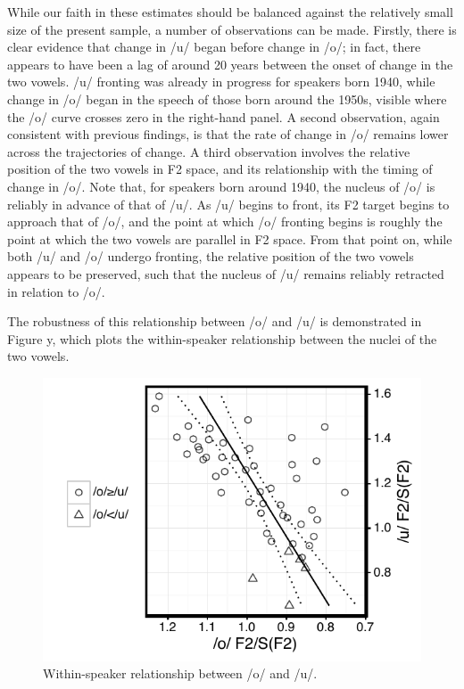 \documentclass[12pt]{article}
\begin{document}
\vspace*{6pt}
While our faith in these estimates should be balanced against the relatively small size of the present sample, a number of observations can be made. Firstly, there is clear evidence that change in /u/ began before change in /o/; in fact, there appears to have been a lag of around 20 years between the onset of change in the two vowels. /u/ fronting was already in progress for speakers born 1940, while change in /o/ began in the speech of those born around the 1950s, visible where the /o/ curve crosses zero in the right-hand panel. A second observation, again consistent with previous findings, is that the rate of change in /o/ remains lower across the trajectories of change. A third observation involves the relative position of the two vowels in F2 space, and its relationship with the timing of change in /o/. Note that, for speakers born around 1940, the nucleus of /o/ is reliably in advance of that of /u/. As /u/ begins to front, its F2 target begins to approach that of /o/, and the point at which /o/ fronting begins is roughly the point at which the two vowels are parallel in F2 space. From that point on, while both /u/ and /o/ undergo fronting, the relative position of the two vowels appears to be preserved, such that the nucleus of /u/ remains reliably retracted in relation to /o/. 

The robustness of this relationship between /o/ and /u/ is demonstrated in Figure y, which plots the within-speaker relationship between the nuclei of the two vowels.

\begin{figure}
\centering
\includegraphics{owuwcorrelation.pdf}
\caption{Within-speaker relationship between /o/ and /u/.}
\end{figure}
\end{document}
